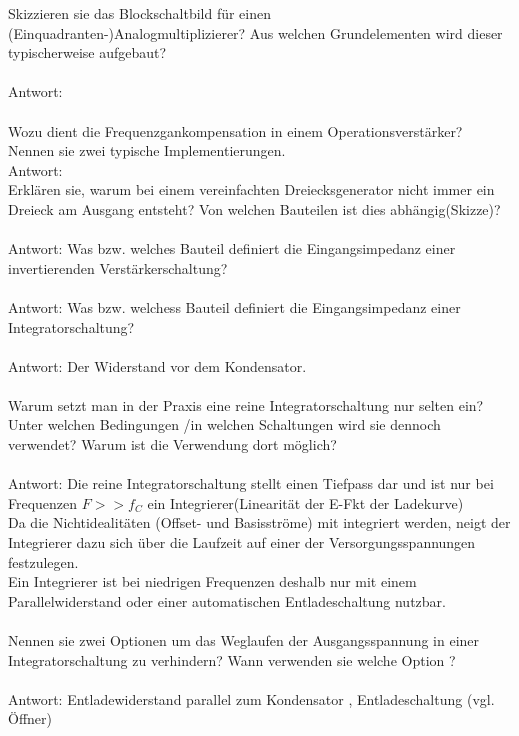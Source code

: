 \documentclass[A4]{scrartcl}
\begin{document}
  Skizzieren sie das Blockschaltbild für einen (Einquadranten-)Analogmultiplizierer? Aus welchen Grundelementen wird dieser typischerweise aufgebaut?\\
  \\
  Antwort:\\\\
  Wozu dient die Frequenzgankompensation in einem Operationsverstärker? Nennen sie zwei typische Implementierungen.\\
  Antwort:
  \\
  Erklären sie, warum bei einem vereinfachten Dreiecksgenerator nicht immer ein Dreieck am Ausgang entsteht? Von welchen Bauteilen ist dies abhängig(Skizze)?\\
  \\
  Antwort:
  Was bzw. welches Bauteil definiert die Eingangsimpedanz einer invertierenden Verstärkerschaltung?\\
  \\
  Antwort:
  Was bzw. welchess Bauteil definiert die Eingangsimpedanz einer Integratorschaltung?\\
  \\
  Antwort: Der Widerstand vor dem Kondensator.\\\\
  Warum setzt man in der Praxis eine reine Integratorschaltung nur selten ein? Unter welchen Bedingungen /in welchen Schaltungen wird sie dennoch verwendet? Warum ist die Verwendung dort möglich?\\
  \\
  Antwort: Die reine Integratorschaltung stellt einen Tiefpass dar und ist nur bei Frequenzen $F >> f_C$ ein Integrierer(Linearität der E-Fkt der Ladekurve)\\
  Da die Nichtidealitäten (Offset- und Basisströme) mit integriert werden, neigt der Integrierer dazu sich über die Laufzeit auf einer der Versorgungsspannungen festzulegen.\\
  Ein Integrierer ist bei niedrigen Frequenzen deshalb nur mit einem Parallelwiderstand oder einer automatischen Entladeschaltung nutzbar.\\\\
  Nennen sie zwei Optionen um das Weglaufen der Ausgangsspannung in einer Integratorschaltung zu verhindern? Wann verwenden sie welche Option ?\\
  \\
  Antwort: Entladewiderstand parallel zum Kondensator , Entladeschaltung (vgl. Öffner)\\\\
\end{document}
